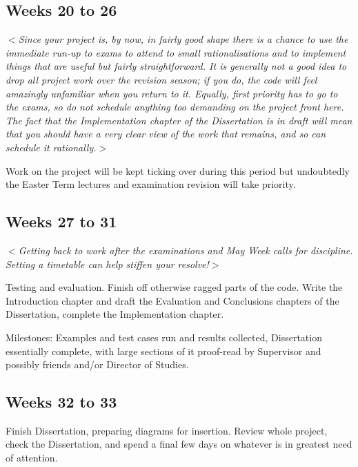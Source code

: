 \documentclass[12pt]{article}
\newcommand{\al}{$<$}
\newcommand{\ar}{$>$}
\begin{document}
\subsection*{Weeks 20 to 26}

\al\emph{Since your project is, by now, in fairly good shape there is
a chance to use the immediate run-up to exams to attend to small
rationalisations and to implement things that are useful but fairly
straightforward.  It is generally not a good idea to drop all project
work over the revision season; if you do, the code will feel amazingly
unfamiliar when you return to it.  Equally, first priority has to go
to the exams, so do not schedule anything too demanding on the project
front here.  The fact that the Implementation chapter of the
Dissertation is in draft will mean that you should have a very clear
view of the work that remains, and so can schedule it rationally.}\ar

Work on the project will be kept ticking over during this period but
undoubtedly the Easter Term lectures and examination revision will
take priority.


\subsection*{Weeks 27 to 31}

\al\emph{Getting back to work after the examinations and May Week
  calls for discipline.  Setting a timetable can help stiffen your
  resolve!}\ar

Testing and evaluation.  Finish off otherwise ragged parts of the
code.  Write the Introduction chapter and draft the Evaluation and
Conclusions chapters of the Dissertation, complete the Implementation
chapter.

Milestones: Examples and test cases run and results collected,
Dissertation essentially complete, with large sections of it
proof-read by Supervisor and possibly friends and/or Director of
Studies.


\subsection*{Weeks 32 to 33}

Finish Dissertation, preparing diagrams for insertion.  Review whole
project, check the Dissertation, and spend a final few days on
whatever is in greatest need of attention.
\end{document}
